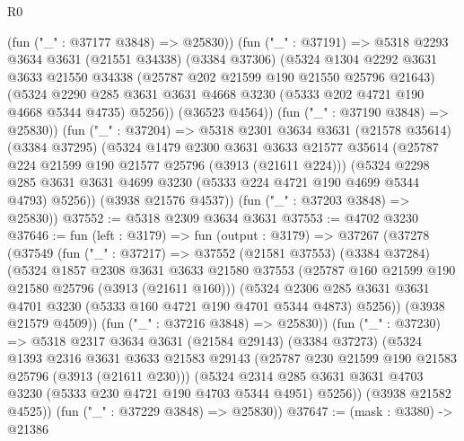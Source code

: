 \begin{lexlean}{R0}
\begin{coremodule}
          (fun ("_" : @37177 @3848) => @25830))
        (fun ("_" : @37191) =>
        @5318
          @2293
          @3634
          @3631
          (@21551 @34338)
          (@3384 @37306)
          (@5324
            @1304
            @2292
            @3631
            @3633
            @21550
            @34338
            (@25787 @202 @21599 @190 @21550 @25796 @21643)
            (@5324
              @2290
              @285
              @3631
              @3631
              @4668
              @3230
              (@5333 @202 @4721 @190 @4668 @5344 @4735)
              @5256))
          (@36523 @4564))
        (fun ("_" : @37190 @3848) => @25830))
      (fun ("_" : @37204) =>
      @5318
        @2301
        @3634
        @3631
        (@21578 @35614)
        (@3384 @37295)
        (@5324
          @1479
          @2300
          @3631
          @3633
          @21577
          @35614
          (@25787 @224 @21599 @190 @21577 @25796 (@3913 (@21611 @224)))
          (@5324
            @2298
            @285
            @3631
            @3631
            @4699
            @3230
            (@5333 @224 @4721 @190 @4699 @5344 @4793)
            @5256))
        (@3938 @21576 @4537))
      (fun ("_" : @37203 @3848) => @25830))
@37552 := @5318 @2309 @3634 @3631
@37553 := @4702 @3230
@37646 := fun (left : @3179) =>
  fun (output : @3179) =>
  @37267
    (@37278
      (@37549
        (fun ("_" : @37217) =>
        @37552
          (@21581 @37553)
          (@3384 @37284)
          (@5324
            @1857
            @2308
            @3631
            @3633
            @21580
            @37553
            (@25787 @160 @21599 @190 @21580 @25796 (@3913 (@21611 @160)))
            (@5324
              @2306
              @285
              @3631
              @3631
              @4701
              @3230
              (@5333 @160 @4721 @190 @4701 @5344 @4873)
              @5256))
          (@3938 @21579 @4509))
        (fun ("_" : @37216 @3848) => @25830))
      (fun ("_" : @37230) =>
      @5318
        @2317
        @3634
        @3631
        (@21584 @29143)
        (@3384 @37273)
        (@5324
          @1393
          @2316
          @3631
          @3633
          @21583
          @29143
          (@25787 @230 @21599 @190 @21583 @25796 (@3913 (@21611 @230)))
          (@5324
            @2314
            @285
            @3631
            @3631
            @4703
            @3230
            (@5333 @230 @4721 @190 @4703 @5344 @4951)
            @5256))
        (@3938 @21582 @4525))
      (fun ("_" : @37229 @3848) => @25830))
@37647 := (mask : @3380) -> @21386

\end{coremodule}
\end{lexlean}
